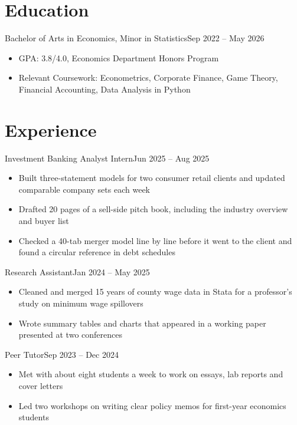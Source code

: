 \documentclass{atsresume}
\begin{document}
\makeheader

\section{Education}

  {Bachelor of Arts in Economics, Minor in Statistics}{Sep 2022 – May 2026}
\begin{itemize}
  \item GPA: 3.8/4.0, Economics Department Honors Program
  \item Relevant Coursework: Econometrics, Corporate Finance, Game Theory,
    Financial Accounting, Data Analysis in Python
\end{itemize}

\section{Experience}

  {Investment Banking Analyst Intern}{Jun 2025 – Aug 2025}
\begin{itemize}
  \item Built three-statement models for two consumer retail clients and
    updated comparable company sets each week
  \item Drafted 20 pages of a sell-side pitch book, including the industry
    overview and buyer list
  \item Checked a 40-tab merger model line by line before it went to the
    client and found a circular reference in debt schedules
\end{itemize}

  {Research Assistant}{Jan 2024 – May 2025}
\begin{itemize}
  \item Cleaned and merged 15 years of county wage data in Stata for a
    professor's study on minimum wage spillovers
  \item Wrote summary tables and charts that appeared in a working paper
    presented at two conferences
\end{itemize}

  {Peer Tutor}{Sep 2023 – Dec 2024}
\begin{itemize}
  \item Met with about eight students a week to work on essays, lab reports
    and cover letters
  \item Led two workshops on writing clear policy memos for first-year
    economics students
\end{itemize}
\end{document}
